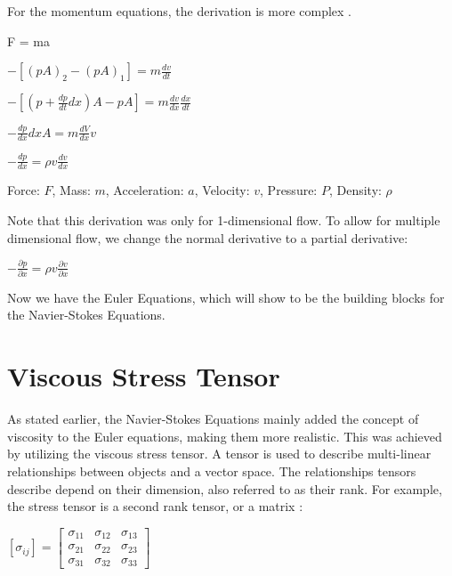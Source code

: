 \documentclass[12pt]{article}
\begin{document}
For the momentum equations, the derivation is more complex \cite{Momentum}.
\begin{center} F = ma\end{center}
\begin{center}$ -[(pA)_2-(pA)_1] = m\frac{dv}{dt} $\end{center}
\begin{center}$ -[(p+\frac{dp}{dt}dx)A - pA] = m\frac{dv}{dx}\frac{dx}{dt} $\end{center}
\begin{center}$ -\frac{dp}{dx}dxA = m\frac{dV}{dx}v $\end{center}
\begin{center}$ -\frac{dp}{dx} = \rho v\frac{dv}{dx} $\end{center}
\begin{center}Force: $F$, Mass: $m$, Acceleration: $a$, Velocity: $v$, Pressure: $P$, Density: $\rho$\end{center}

Note that this derivation was only for 1-dimensional flow. To allow for multiple dimensional flow, we change the normal derivative to a partial derivative:
\begin{center}$ -\frac{\partial p}{\partial x} = \rho v\frac{\partial v}{\partial x} $\end{center}

Now we have the Euler Equations, which will show to be the building blocks for the Navier-Stokes Equations.

\section{Viscous Stress Tensor}
As stated earlier, the Navier-Stokes Equations mainly added the concept of viscosity to the Euler equations, making them more realistic. This was achieved by utilizing the viscous stress tensor.
A tensor is used to describe multi-linear relationships between objects and a vector space. The relationships tensors describe depend on their dimension, also referred to as their rank. For example, the stress tensor is a second rank tensor, or a matrix \cite{Tensors}:

\begin{center} $[\sigma_{ij}] = \begin{bmatrix} \sigma_{11} & \sigma_{12} & \sigma_{13}\\ \sigma_{21} & \sigma_{22} & \sigma_{23}\\ \sigma_{31} & \sigma_{32} & \sigma_{33}\end{bmatrix}$
\end{center}
\end{document}
